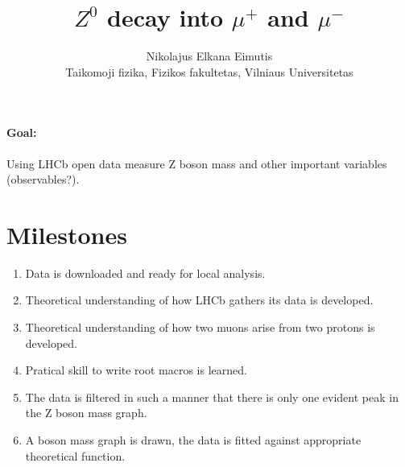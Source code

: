 \documentclass[11pt,a4paper,twoside]{article}
\begin{document}
\sloppy					%


\title{$Z^0$ decay into $\mu^{+}$ and $\mu^{-}$}
\author{Nikolajus Elkana Eimutis \\ Taikomoji fizika, Fizikos fakultetas, Vilniaus Universitetas}
\maketitle

\onehalfspace

\paragraph*{Goal:}
Using LHCb open data measure Z boson mass and other important variables (observables?).


\section{Milestones}

\begin{enumerate}
        \item Data is downloaded and ready for local analysis.
        
        \item Theoretical understanding of how LHCb gathers its data is developed.
        
        \item Theoretical understanding of how two muons arise from two protons is developed.

        \item Pratical skill to write root macros is learned.

        \item The data is filtered in such a manner that there is only one evident peak in the Z boson mass graph.

        \item A boson mass graph is drawn, the data is fitted against appropriate theoretical function.
\end{enumerate}
	
\newpage
\end{document}
